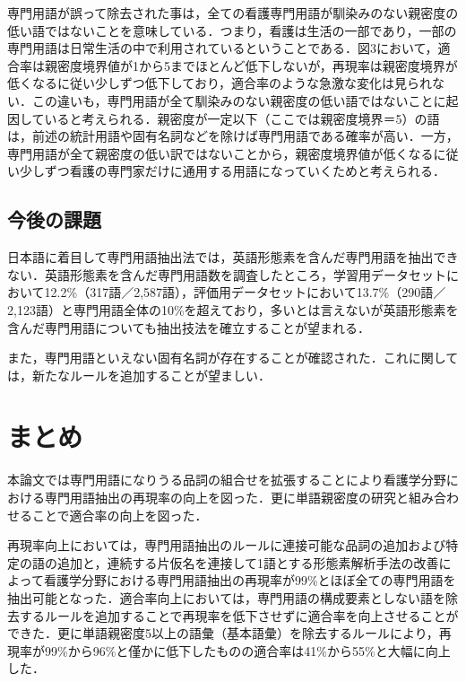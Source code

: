 \documentclass[japanese]{jnlp_1.4}
\begin{document}
専門用語が誤って除去された事は，全ての看護専門用語が馴染みのない親密度の低い語ではないことを意味している．つまり，看護は生活の一部であり，一部の専門用語は日常生活の中で利用されているということである．図3において，適合率は親密度境界値が1から5までほとんど低下しないが，再現率は親密度境界が低くなるに従い少しずつ低下しており，適合率のような急激な変化は見られない．この違いも，専門用語が全て馴染みのない親密度の低い語ではないことに起因していると考えられる．親密度が一定以下（ここでは親密度境界＝5）の語は，前述の統計用語や固有名詞などを除けば専門用語である確率が高い．一方，専門用語が全て親密度の低い訳ではないことから，親密度境界値が低くなるに従い少しずつ看護の専門家だけに通用する用語になっていくためと考えられる．



\subsection{今後の課題}

日本語に着目して専門用語抽出法では，英語形態素を含んだ専門用語を抽出できない．英語形態素を含んだ専門用語数を調査したところ，学習用データセットにおいて12.2{\%}（317語／2,587語），評価用データセットにおいて13.7{\%}（290語／2,123語）と専門用語全体の10{\%}を超えており，多いとは言えないが英語形態素を含んだ専門用語についても抽出技法を確立することが望まれる．

また，専門用語といえない固有名詞が存在することが確認された．これに関しては，新たなルールを追加することが望ましい．



\section{まとめ}

本論文では専門用語になりうる品詞の組合せを拡張することにより看護学分野における専門用語抽出の再現率の向上を図った．更に単語親密度の研究と組み合わせることで適合率の向上を図った．

再現率向上においては，専門用語抽出のルールに連接可能な品詞の追加および特定の語の追加と，連続する片仮名を連接して1語とする形態素解析手法の改善によって看護学分野における専門用語抽出の再現率が99{\%}とほぼ全ての専門用語を抽出可能となった．適合率向上においては，専門用語の構成要素としない語を除去するルールを追加することで再現率を低下させずに適合率を向上させることができた．更に単語親密度5以上の語彙（基本語彙）を除去するルールにより，再現率が99{\%}から96{\%}と僅かに低下したものの適合率は41{\%}から55{\%}と大幅に向上した．
\end{document}
